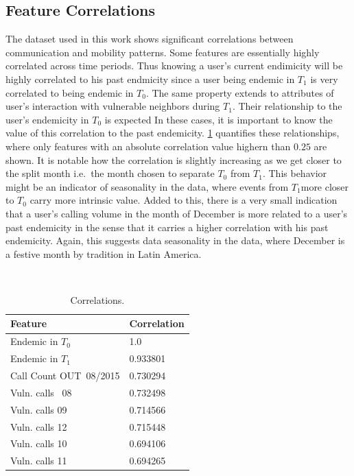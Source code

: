 \subsection{ Feature Correlations }\label{subsection:feature_correlations} %


The dataset used in this work shows significant correlations between communication and mobility patterns.
Some features are essentially highly correlated across time periods.
Thus knowing a user's current endimicity will be highly correlated to his past endmicity since a user being endemic in $T_1$ is very correlated to being endemic in $T_0$.
The same property extends to attributes of user's interaction with vulnerable neighbors during $T_1$.
Their relationship to the user's endemicity in $T_0$ is expected
In these cases, it is important to know the value of this correlation to the past endemicity.
\cref{tab:featureCorrelations} quantifies these relationships, where only features with an absolute correlation value highern than $0.25$ are shown.
It is notable how the correlation is slightly increasing as we get closer to the split month i.e.\ the month chosen to separate $T_0$ from $T_1$.
This behavior might be an indicator of seasonality in the data, where events from $T_1$more closer to $T_0$ carry more intrinsic value.
Added to this, there is a very small indication that a user's calling volume in the month of December is more related to a user's past endemicity in the sense that it carries a higher correlation with his past endemicity.
Again, this suggests data seasonality in the data, where December is a festive month by tradition in Latin America.


\hfill
\
\begin{table}\label{tab:featureCorrelations}
	\caption{Correlations.}
	\centering
	\begin{tabular}{l l }
		\toprule
		Feature & Correlation \\
		\midrule
		Endemic in $T_0$        & 1.0 \\
		Endemic in $T_1$        & 0.933801 \\
		Call Count  OUT\ 08/2015  & 0.730294 \\ %
		Vuln. calls \ 08   & 0.732498 \\
		Vuln. calls  09   & 0.714566 \\
		Vuln.  calls 12  & 0.715448 \\
		Vuln. calls  10  & 0.694106 \\
		Vuln. calls  11   & 0.694265 \\
	\end{tabular}
\end{table}



